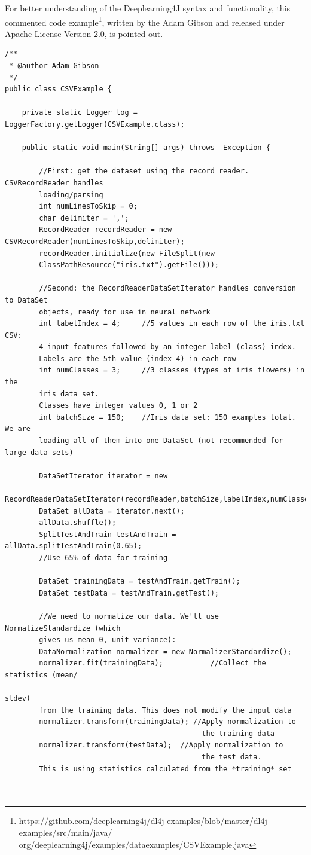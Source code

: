 For better understanding of the Deeplearning4J syntax and functionality,
this commented code example\footnote{https://github.com/deeplearning4j/dl4j-examples/blob/master/dl4j-examples/src/main/java/
  org/deeplearning4j/examples/dataexamples/CSVExample.java}, written by
the Adam Gibson and released under Apache License Version 2.0, is
pointed out.

\begin{verbatim}
/**
 * @author Adam Gibson
 */
public class CSVExample {

    private static Logger log = LoggerFactory.getLogger(CSVExample.class);

    public static void main(String[] args) throws  Exception {

        //First: get the dataset using the record reader. CSVRecordReader handles 
        loading/parsing
        int numLinesToSkip = 0;
        char delimiter = ',';
        RecordReader recordReader = new CSVRecordReader(numLinesToSkip,delimiter);
        recordReader.initialize(new FileSplit(new 
        ClassPathResource("iris.txt").getFile()));

        //Second: the RecordReaderDataSetIterator handles conversion to DataSet 
        objects, ready for use in neural network
        int labelIndex = 4;     //5 values in each row of the iris.txt CSV: 
        4 input features followed by an integer label (class) index. 
        Labels are the 5th value (index 4) in each row
        int numClasses = 3;     //3 classes (types of iris flowers) in the 
        iris data set. 
        Classes have integer values 0, 1 or 2
        int batchSize = 150;    //Iris data set: 150 examples total. We are 
        loading all of them into one DataSet (not recommended for large data sets)

        DataSetIterator iterator = new 
        RecordReaderDataSetIterator(recordReader,batchSize,labelIndex,numClasses);
        DataSet allData = iterator.next();
        allData.shuffle();
        SplitTestAndTrain testAndTrain = allData.splitTestAndTrain(0.65);  
        //Use 65% of data for training

        DataSet trainingData = testAndTrain.getTrain();
        DataSet testData = testAndTrain.getTest();

        //We need to normalize our data. We'll use NormalizeStandardize (which 
        gives us mean 0, unit variance):
        DataNormalization normalizer = new NormalizerStandardize();
        normalizer.fit(trainingData);           //Collect the statistics (mean/
                                                                         stdev) 
        from the training data. This does not modify the input data
        normalizer.transform(trainingData); //Apply normalization to 
                                              the training data
        normalizer.transform(testData);  //Apply normalization to 
                                              the test data. 
        This is using statistics calculated from the *training* set



\end{verbatim}
